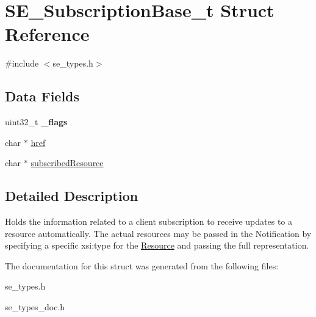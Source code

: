 \hypertarget{structSE__SubscriptionBase__t}{}\section{S\+E\+\_\+\+Subscription\+Base\+\_\+t Struct Reference}
\label{structSE__SubscriptionBase__t}


{\ttfamily \#include $<$se\+\_\+types.\+h$>$}

\subsection*{Data Fields}
\begin{DoxyCompactItemize}
\item 
uint32\+\_\+t {\bfseries \+\_\+flags}
\item 
char $\ast$ \hyperlink{group__SubscriptionBase_ga397ee2afb88c8687bccb35b3acec3490}{href}
\item 
char $\ast$ \hyperlink{group__SubscriptionBase_ga20d85c9e20b561f7f7d7aa3b337c0e4f}{subscribed\+Resource}
\end{DoxyCompactItemize}


\subsection{Detailed Description}
Holds the information related to a client subscription to receive updates to a resource automatically. The actual resources may be passed in the Notification by specifying a specific xsi\+:type for the \hyperlink{structResource}{Resource} and passing the full representation. 

The documentation for this struct was generated from the following files\+:\begin{DoxyCompactItemize}
\item 
se\+\_\+types.\+h\item 
se\+\_\+types\+\_\+doc.\+h\end{DoxyCompactItemize}
